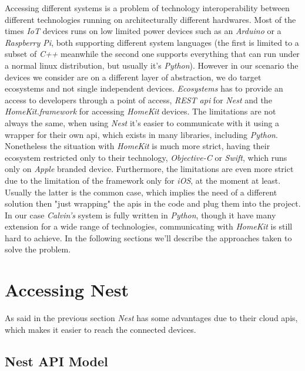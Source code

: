 Accessing different systems is a problem of technology interoperability between
different technologies running on architecturally different hardwares.
Most of the times \textit{IoT} devices runs on low limited power devices such as
an \textit{Arduino} or a \textit{Raspberry Pi}, both supporting different system
languages (the first is limited to a subset of \textit{C++} meanwhile the second one supports everything
that can run under a normal linux distribution, but usually it's \textit{Python}).
However in our scenario the devices we consider are on a different layer of abstraction,
we do target ecosystems and not single independent devices. \textit{Ecosystems} has to
provide an access to developers through a point of access, \textit{REST api} for   \textit{Nest}
and the \textit{HomeKit.framework} for accessing \textit{HomeKit} devices.
The limitations are not always the same, when using \textit{Nest} it's easier to communicate
with it using a wrapper for their own api, which exists in many libraries, including \textit{Python}.
Nonetheless the situation with \textit{HomeKit} is much more strict, having their ecosystem
restricted only to their technology, \textit{Objective-C} or \textit{Swift}, which runs only
on \textit{Apple} branded device. Furthermore, the limitations are even more strict
due to the limitation of the framework only for \textit{iOS}, at the moment at least.
Usually the latter is the common case, which implies the need of a different solution
then "just wrapping" the apis in the code and plug them into the project.
In our case \textit{Calvin's} system is fully written in \textit{Python},
though it have many extension for a wide range of technologies, communicating
with \textit{HomeKit} is still hard to achieve.
In the following sections we'll describe the approaches taken to solve
the problem.


\section{Accessing Nest}

As said in the previous section \textit{Nest} has some advantages
due to their cloud apis, which makes it easier to reach the connected devices.

\subsection{Nest API Model}

